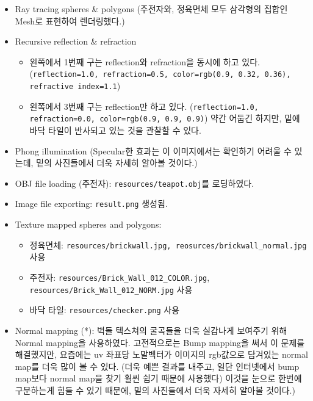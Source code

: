\documentclass[11pt, a4paper]{article}
\begin{document}
\begin{itemize}
  \item Ray tracing spheres \& polygons (주전자와, 정육면체 모두 삼각형의 집합인 Mesh로 표현하여 렌더링했다.)

  \item Recursive reflection \& refraction
    \begin{itemize}
      \item 왼쪽에서 1번째 구는 reflection와 refraction을 동시에 하고 있다. (\texttt{reflection=1.0, refraction=0.5, color=rgb(0.9, 0.32, 0.36), refractive index=1.1})
      \item 왼쪽에서 3번째 구는 reflection만 하고 있다. (\texttt{reflection=1.0, refraction=0.0, color=rgb(0.9, 0.9, 0.9)}) 약간 어둡긴 하지만, 밑에 바닥 타일이 반사되고 있는 것을 관찰할 수 있다.
    \end{itemize}

  \item Phong illumination (Specular한 효과는 이 이미지에서는 확인하기 어려울 수 있는데, 밑의 사진들에서 더욱 자세히 알아볼 것이다.)

  \item OBJ file loading (주전자): \texttt{resources/teapot.obj}를 로딩하였다.

  \item Image file exporting: \texttt{result.png} 생성됨.

  \item Texture mapped spheres and polygons:
    \begin{itemize}
      \item 정육면체: \texttt{resources/brickwall.jpg, reosurces/brickwall\_normal.jpg} 사용
      \item 주전자: \texttt{resources/Brick\_Wall\_012\_COLOR.jpg}, \texttt{resources/Brick\_Wall\_012\_NORM.jpg} 사용
      \item 바닥 타일: \texttt{resources/checker.png} 사용
    \end{itemize}

  \item Normal mapping (*): 벽돌 텍스쳐의 굴곡들을 더욱 실감나게 보여주기 위해 Normal mapping을 사용하였다. 고전적으로는 Bump mapping을 써서 이 문제를 해결했지만, 요즘에는 uv 좌표당 노말벡터가 이미지의 rgb값으로 담겨있는 normal map를 더욱 많이 볼 수 있다. (더욱 예쁜 결과를 내주고, 일단 인터넷에서 bump map보다 normal map을 찾기 훨씬 쉽기 때문에 사용했다) 이것을 눈으로 한번에 구분하는게 힘들 수 있기 때문에, 밑의 사진들에서 더욱 자세히 알아볼 것이다.)


\end{itemize}
\end{document}

